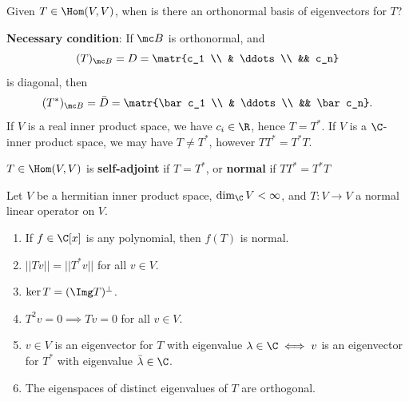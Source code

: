 \begin{notebox*}
    Given $T \in \Hom(V,V)$, when is there an orthonormal basis of eigenvectors for $T$?
\end{notebox*}

\textbf{Necessary condition}: If $\mc B$ is orthonormal, and
$$(T)_{\mc B}=D= \matr{c_1 \\ & \ddots \\ && c_n}$$
is diagonal, then
$$(T^*)_{\mc B} = \bar D=\matr{\bar c_1 \\ & \ddots \\ && \bar c_n}.$$
If $V$ is a real inner product space, we have $c_i \in \R$, hence $T = T^*$. If $V$ is a $\C$-inner product space, we may have $T \neq T^*$, however $TT^*=T^*T.$

\begin{defn}
    $T \in \Hom(V,V)$ is \textbf{self-adjoint} if $T=T^*$, or \textbf{normal} if $TT^*=T^*T$
\end{defn}

\begin{prop}[][label=prop:sixprops]
    Let $V$ be a hermitian inner product space, $\dim_\C V < \infty$, and $T:V \to V$ a normal linear operator on $V$.
    \begin{enumerate}
        \item If $f \in \C[x]$ is any polynomial, then $f(T)$ is normal.
        \item $||Tv||=||T^*v||$ for all $v \in V$.
        \item $\ker T = (\Img T)^\perp$.
        \item $T^2v =0 \implies Tv=0$ for all $v \in V$.
        \item $v \in V$ is an eigenvector for $T$ with eigenvalue $\lambda \in \C \iff v$ is an eigenvector for $T^*$ with eigenvalue $\bar \lambda \in \C$.
        \item The eigenspaces of distinct eigenvalues of $T$ are orthogonal.
    \end{enumerate}
\end{prop}

